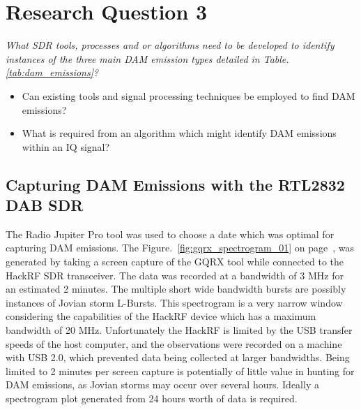 \newpage
\chapter*{Research Question 3}

\textit{What \gls{SDR} tools, processes and or algorithms need to be developed to identify instances of the three main \gls{DAM} emission types detailed in Table. \ref{tab:dam_emissions}?}

\begin{itemize}
	\item Can existing tools and signal processing techniques be employed to find \gls{DAM} emissions?
	\item What is required from an algorithm which might identify \gls{DAM} emissions within an \gls{IQ} signal?
\end{itemize}

\section*{Capturing DAM Emissions with the RTL2832 DAB SDR}

The Radio Jupiter Pro tool was used to choose a date which was optimal for capturing \gls{DAM} emissions. The Figure.~\ref{fig:gqrx_spectrogram_01} on page~\pageref{fig:gqrx_spectrogram_01}, was generated by taking a screen capture of the GQRX tool while connected to the HackRF \gls{SDR} transceiver. The data was recorded at a bandwidth of 3 MHz for an estimated 2 minutes. The multiple short wide bandwidth bursts are possibly instances of Jovian storm L-Bursts. This spectrogram is a very narrow window considering the capabilities of the HackRF device which has a maximum bandwidth of 20 MHz. Unfortunately the HackRF is limited by the USB transfer speeds of the host computer, and the observations were recorded on a machine with USB 2.0, which prevented data being collected at larger bandwidths. Being limited to 2 minutes per screen capture is potentially of little value in hunting for \gls{DAM} emissions, as Jovian storms may occur over several hours. Ideally a spectrogram plot generated from 24 hours worth of data is required.

